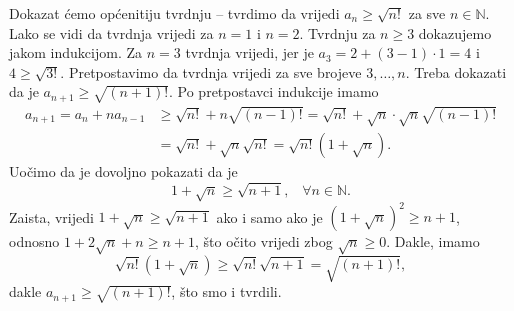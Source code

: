 \documentclass{book}
\renewenvironment{proof}{%
    \vspace{-\parskip}\begin{oldproof}%
    }{%
    \end{oldproof}%
}
\theoremstyle{definition}
\theoremstyle{definition}
\theoremstyle{remark}
\begin{document}
\begin{proof}[Rješenje]
Dokazat ćemo općenitiju tvrdnju -- tvrdimo da vrijedi $a_n\geq \sqrt{n!}$ za sve $n\in \mathbb{N}$. Lako se vidi da tvrdnja vrijedi za $n=1$ i $n=2$. Tvrdnju za $n\geq 3$ dokazujemo jakom indukcijom. Za $n=3$ tvrdnja vrijedi, jer je $a_3=2+(3-1)\cdot 1=4$ i $4\geq \sqrt{3!}$. Pretpostavimo da tvrdnja vrijedi za sve brojeve $3, \dots, n$. Treba dokazati da je $a_{n+1}\geq\sqrt{(n+1)!}$. Po pretpostavci indukcije imamo
\begin{align*}
a_{n+1}=a_n+na_{n-1}&\geq \sqrt{n!}+n\sqrt{(n-1)!}=\sqrt{n!}+\sqrt{n}\cdot\sqrt{n}\sqrt{(n-1)!}\\
&=\sqrt{n!}+\sqrt{n}\sqrt{n!}=\sqrt{n!}(1+\sqrt{n}).
\end{align*}
Uočimo da je dovoljno pokazati da je $$1+\sqrt{n}\geq \sqrt{n+1}, \;\;\;\forall n\in \mathbb{N}.$$ 
Zaista, vrijedi $1+\sqrt{n}\geq \sqrt{n+1}$ ako i samo ako je $(1+\sqrt{n})^2\geq n+1$, odnosno $1+2\sqrt{n}+n\geq n+1$, što očito vrijedi zbog $\sqrt{n}\geq 0$. Dakle, imamo 
$$\sqrt{n!}(1+\sqrt{n})\geq \sqrt{n!}\sqrt{n+1}=\sqrt{(n+1)!},$$
dakle $a_{n+1}\geq \sqrt{(n+1)!}$, što smo i tvrdili.
\end{proof}
\end{document}
